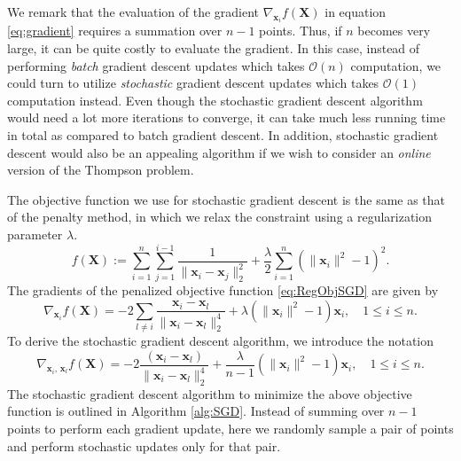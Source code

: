 \documentclass[11pt]{article}
\begin{document}
We remark that the evaluation of the gradient $\nabla_{\bm{x}_i}f(\bm{X})$ in equation \eqref{eq:gradient} requires a summation over $n-1$ points. Thus, if $n$ becomes very large, it can be quite costly to evaluate the gradient. In this case, instead of performing \emph{batch} gradient descent updates which takes $\mathcal{O}(n)$ computation, we could turn to utilize \emph{stochastic} gradient descent updates which takes $\mathcal{O}(1)$ computation instead. Even though the stochastic gradient descent algorithm would need a lot more iterations to converge, it can take much less running time in total as compared to batch gradient descent. In addition, stochastic gradient descent would also be an appealing algorithm if we wish to consider an \emph{online} version of the Thompson problem.

The objective function we use for stochastic gradient descent is the same as that of the penalty method, in which we relax the constraint using a regularization parameter $\lambda$.
\begin{equation}\label{eq:RegObjSGD}
f(\bm{X}) := \sum_{i=1}^n\sum_{j=1}^{i-1}\frac{1}{\|\bm{x}_i-\bm{x}_j\|_2^2} + \frac{\lambda}{2} \sum_{i=1}^n \left(\|\bm{x}_i\|^2-1\right)^2.
\end{equation}
The gradients of the penalized objective function \eqref{eq:RegObjSGD} are given by
\begin{equation}\label{eq:gradient}
\nabla_{\bm{x}_i} f(\bm{X}) = -2\sum_{l\neq i} \frac{\bm{x}_i-\bm{x}_l}{\|\bm{x}_i-\bm{x}_l\|_2^4} + \lambda\left(\|\bm{x}_i\|^2-1\right)\bm{x}_i, \quad 1\le i\le n.
\end{equation}
To derive the stochastic gradient descent algorithm, we introduce the notation
\begin{equation}\label{eq:gradient}
\nabla_{\bm{x}_i,\,\bm{x}_l} f(\bm{X}) = -2\frac{(\bm{x}_i-\bm{x}_l)}{\|\bm{x}_i-\bm{x}_l\|_2^4} + \frac{\lambda}{n-1}\left(\|\bm{x}_i\|^2-1\right)\bm{x}_i, \quad 1\le i\le n.
\end{equation}	
The stochastic gradient descent algorithm to minimize the above objective function is outlined in Algorithm \ref{alg:SGD}. Instead of summing over $n-1$ points to perform each gradient update, here we randomly sample a pair of points and perform stochastic updates only for that pair.
\end{document}
